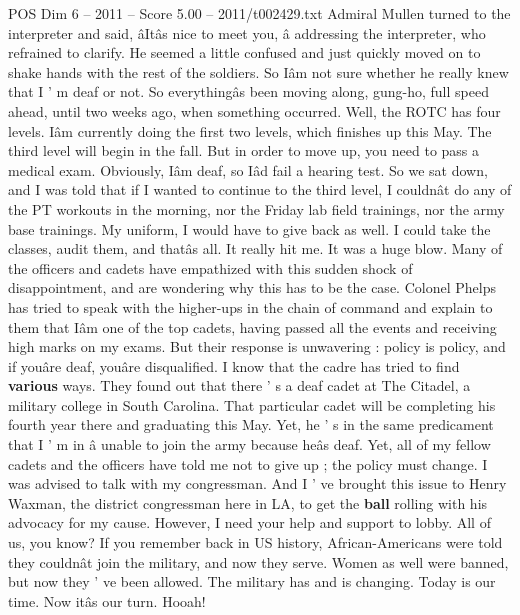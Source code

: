 \begin{textsample}{POS Dim 6 – 2011 – Score 5.00 – 2011/t002429.txt}
Admiral Mullen turned to the interpreter and said, âItâs nice to meet you, â addressing the interpreter, who refrained to clarify.
He seemed a little confused and just quickly moved on to shake hands with the rest of the soldiers.
So Iâm not sure whether he really knew that I ' m deaf or not.
So everythingâs been moving along, gung-ho, full speed ahead, until two weeks ago, when something occurred.
Well, the ROTC has four levels.
Iâm currently doing the first two levels, which finishes up this May.
The third level will begin in the fall.
But in order to move up, you need to pass a medical exam.
Obviously, Iâm deaf, so Iâd fail a hearing test.
So we sat down, and I was told that if I wanted to continue to the third level, I couldnât do any of the PT workouts in the morning, nor the Friday lab field trainings, nor the army base trainings.
My uniform, I would have to give back as well.
I could take the classes, audit them, and thatâs all.
It really hit me.
It was a huge blow.
Many of the officers and cadets have empathized with this sudden shock of disappointment, and are wondering why this has to be the case.
Colonel Phelps has tried to speak with the higher-ups in the chain of command and explain to them that Iâm one of the top cadets, having passed all the events and receiving high marks on my exams.
But their response is unwavering : policy is policy, and if youâre deaf, youâre disqualified.
I know that the cadre has tried to find \textbf{various} ways.
They found out that there ' s a deaf cadet at The Citadel, a military college in South Carolina.
That particular cadet will be completing his fourth year there and graduating this May.
Yet, he ' s in the same predicament that I ' m in â unable to join the army because heâs deaf.
Yet, all of my fellow cadets and the officers have told me not to give up ; the policy must change.
I was advised to talk with my congressman.
And I ' ve brought this issue to Henry Waxman, the district congressman here in LA, to get the \textbf{ball} rolling with his advocacy for my cause.
However, I need your help and support to lobby.
All of us, you know?
If you remember back in US history, African-Americans were told they couldnât join the military, and now they serve.
Women as well were banned, but now they ' ve been allowed.
The military has and is changing.
Today is our time.
Now itâs our turn.
Hooah!

\end{textsample}
